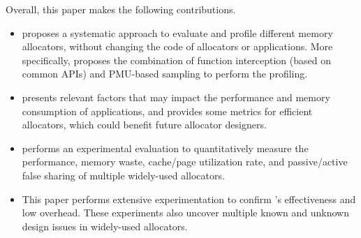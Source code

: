 Overall, this paper makes the following contributions. 

\begin{itemize}
\item \MP{} proposes a systematic approach to evaluate and profile different memory allocators, without changing the code of allocators or applications. More specifically, \MP{} proposes the combination of function interception (based on common APIs) and PMU-based sampling to perform the profiling.


\item \MP{} presents relevant factors that may impact the performance and memory consumption of applications, and provides some metrics for efficient allocators, which could benefit future allocator designers. 

\item \MP{} performs an experimental evaluation to quantitatively measure the performance, memory waste, cache/page utilization rate, and passive/active false sharing of multiple widely-used allocators.
\item This paper performs extensive experimentation to confirm \MP{}'s effectiveness and low overhead. These experiments also uncover multiple known and unknown design issues in widely-used allocators.  

\end{itemize} 

